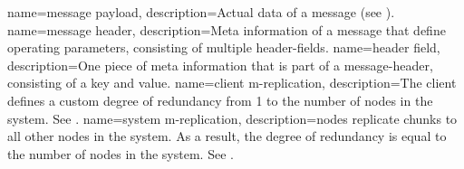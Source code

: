 {
    name={message payload},
    description={Actual data of a \gls{message} (see ).}
}
{
    name={message header},
    description={Meta information of a \gls{message} that define operating parameters, consisting of multiple \glspl{header-field}.}
}
{
    name={header field},
    description={One piece of meta information that is part of a \gls{message-header}, consisting of a key and value.}
}
{
    name={client m-replication},
    description={The \gls{client} defines a custom degree of redundancy from 1 to the number of \glspl{node} in the system. See .}
}
{
    name={system m-replication},
    description={\Glspl{node} replicate \glspl{chunk} to all other \glspl{node} in the system. As a result, the degree of redundancy is equal to the number of \glspl{node} in the system. See .}
}
